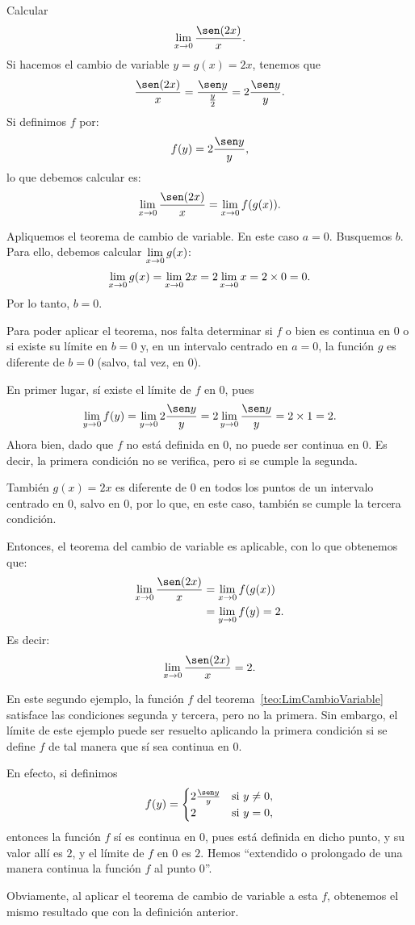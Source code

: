 \begin{exemplo}[Solución]{%
Calcular
\[
\limjc{\frac{\sen(2x)}{x}}{x}{0}.
\]
}%
Si hacemos el cambio de variable $y = g(x) = 2x$, tenemos que
\[
\frac{\sen(2x)}{x} = \frac{\sen y}{\frac{y}{2}} = 2\frac{\sen y}{y}.
\]
Si definimos $f$ por:
\[
f(y)= 2\frac{\sen y}{y},
\]
lo que debemos calcular es:
\[
\limjc{\frac{\sen(2x)}{x}}{x}{0} = \limjc{f(g(x))}{x}{0}.
\]

Apliquemos el teorema de cambio de variable. En este caso $a = 0$. Busquemos $b$. Para ello,
debemos calcular $\displaystyle\limjc{g(x)}{x}{0}$:
\[
\limjc{g(x)}{x}{0} = \limjc{2x}{x}{0} = 2\limjc{x}{x}{0} = 2\times 0 = 0.
\]
Por lo tanto, $b = 0$.

Para poder aplicar el teorema, nos falta determinar si $f$ o bien es continua en $0$ o si existe su
límite en $b = 0$ y, en un intervalo centrado en $a = 0$, la función $g$ es diferente de $b = 0$
(salvo, tal vez, en $0$).

En primer lugar, sí existe el límite de $f$ en $0$, pues
\[
\limjc{f(y)}{y}{0} = \limjc{2\frac{\sen y}{y}}{y}{0} = 2\limjc{\frac{\sen y}{y}}{y}{0} = 2\times 1 = 2.
\]
Ahora bien, dado que $f$ no está definida en $0$, no puede ser continua en $0$. Es decir, la
primera condición no se verifica, pero si se cumple la segunda.

También $g(x) = 2x$ es diferente de $0$ en todos los puntos de un intervalo centrado en $0$, salvo
en $0$, por lo que, en este caso, también se cumple la tercera condición.

Entonces, el teorema del cambio de variable es aplicable, con lo que obtenemos que:
\begin{align*}
\limjc{\frac{\sen(2x)}{x}}{x}{0} &= \limjc{f(g(x))}{x}{0} \\
&= \limjc{f(y)}{y}{0} = 2.
\end{align*}
Es decir:
\[
\limjc{\frac{\sen(2x)}{x}}{x}{0} = 2.
\]

En este segundo ejemplo, la función $f$ del teorema~\ref{teo:LimCambioVariable} satisface las
condiciones segunda y tercera, pero no la primera. Sin embargo, el límite de este ejemplo puede ser resuelto
aplicando la primera condición si se define $f$ de tal manera que sí sea continua en $0$.

En efecto, si definimos
\[
f(y) =
\begin{cases}
2\frac{\sen y}{y} & \text{si} \ y \neq 0, \\
2 & \text{si} \ y = 0,
\end{cases}
\]
entonces la función $f$ sí es continua en $0$, pues está definida en dicho punto, y su valor allí
es $2$, y el límite de $f$ en $0$ es $2$. Hemos ``extendido o prolongado de una manera continua la función $f$ al punto $0$''.

Obviamente, al aplicar el teorema de cambio de variable a esta $f$, obtenemos el mismo resultado
que con la definición anterior.
\end{exemplo}

